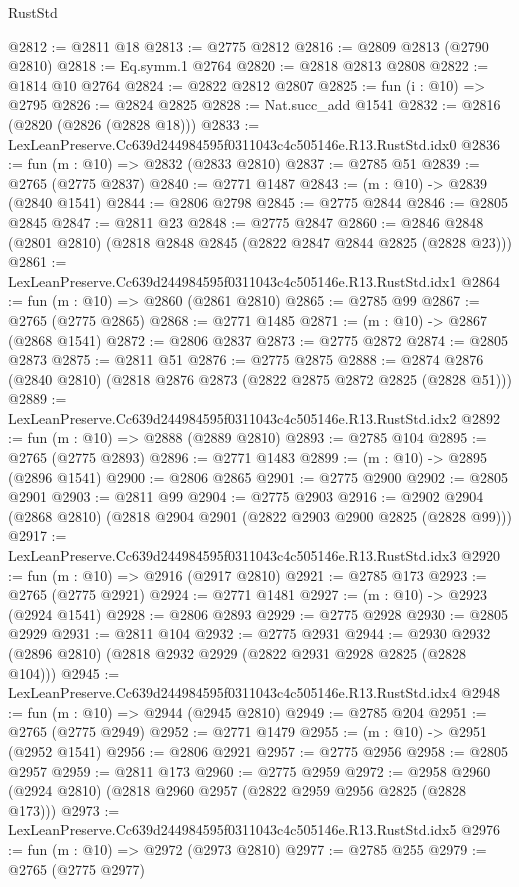 \begin{lexlean}{RustStd}
\begin{coremodule}
@2812 := @2811 @18
@2813 := @2775 @2812
@2816 := @2809 @2813 (@2790 @2810)
@2818 := Eq.symm.{1} @2764
@2820 := @2818 @2813 @2808
@2822 := @1814 @10 @2764
@2824 := @2822 @2812 @2807
@2825 := fun (i : @10) => @2795
@2826 := @2824 @2825
@2828 := Nat.succ_add @1541
@2832 := @2816 (@2820 (@2826 (@2828 @18)))
@2833 := LexLeanPreserve.Cc639d244984595f0311043c4c505146e.R13.RustStd.idx0
@2836 := fun (m : @10) => @2832 (@2833 @2810)
@2837 := @2785 @51
@2839 := @2765 (@2775 @2837)
@2840 := @2771 @1487
@2843 := (m : @10) -> @2839 (@2840 @1541)
@2844 := @2806 @2798
@2845 := @2775 @2844
@2846 := @2805 @2845
@2847 := @2811 @23
@2848 := @2775 @2847
@2860 := @2846 @2848 (@2801 @2810) (@2818 @2848 @2845 (@2822 @2847 @2844 @2825 (@2828 @23)))
@2861 := LexLeanPreserve.Cc639d244984595f0311043c4c505146e.R13.RustStd.idx1
@2864 := fun (m : @10) => @2860 (@2861 @2810)
@2865 := @2785 @99
@2867 := @2765 (@2775 @2865)
@2868 := @2771 @1485
@2871 := (m : @10) -> @2867 (@2868 @1541)
@2872 := @2806 @2837
@2873 := @2775 @2872
@2874 := @2805 @2873
@2875 := @2811 @51
@2876 := @2775 @2875
@2888 := @2874 @2876 (@2840 @2810) (@2818 @2876 @2873 (@2822 @2875 @2872 @2825 (@2828 @51)))
@2889 := LexLeanPreserve.Cc639d244984595f0311043c4c505146e.R13.RustStd.idx2
@2892 := fun (m : @10) => @2888 (@2889 @2810)
@2893 := @2785 @104
@2895 := @2765 (@2775 @2893)
@2896 := @2771 @1483
@2899 := (m : @10) -> @2895 (@2896 @1541)
@2900 := @2806 @2865
@2901 := @2775 @2900
@2902 := @2805 @2901
@2903 := @2811 @99
@2904 := @2775 @2903
@2916 := @2902 @2904 (@2868 @2810) (@2818 @2904 @2901 (@2822 @2903 @2900 @2825 (@2828 @99)))
@2917 := LexLeanPreserve.Cc639d244984595f0311043c4c505146e.R13.RustStd.idx3
@2920 := fun (m : @10) => @2916 (@2917 @2810)
@2921 := @2785 @173
@2923 := @2765 (@2775 @2921)
@2924 := @2771 @1481
@2927 := (m : @10) -> @2923 (@2924 @1541)
@2928 := @2806 @2893
@2929 := @2775 @2928
@2930 := @2805 @2929
@2931 := @2811 @104
@2932 := @2775 @2931
@2944 := @2930 @2932 (@2896 @2810) (@2818 @2932 @2929 (@2822 @2931 @2928 @2825 (@2828 @104)))
@2945 := LexLeanPreserve.Cc639d244984595f0311043c4c505146e.R13.RustStd.idx4
@2948 := fun (m : @10) => @2944 (@2945 @2810)
@2949 := @2785 @204
@2951 := @2765 (@2775 @2949)
@2952 := @2771 @1479
@2955 := (m : @10) -> @2951 (@2952 @1541)
@2956 := @2806 @2921
@2957 := @2775 @2956
@2958 := @2805 @2957
@2959 := @2811 @173
@2960 := @2775 @2959
@2972 := @2958 @2960 (@2924 @2810) (@2818 @2960 @2957 (@2822 @2959 @2956 @2825 (@2828 @173)))
@2973 := LexLeanPreserve.Cc639d244984595f0311043c4c505146e.R13.RustStd.idx5
@2976 := fun (m : @10) => @2972 (@2973 @2810)
@2977 := @2785 @255
@2979 := @2765 (@2775 @2977)

\end{coremodule}
\end{lexlean}
